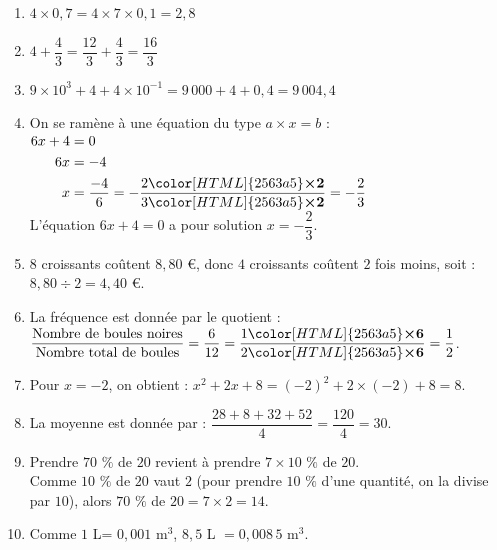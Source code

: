 \documentclass[a4paper,11pt,exos]{nsi} %
\begin{document}
\textcolor{UGLiBlue}{
    \begin{enumerate}[itemsep=1em]
        \item $4 \times 0{,}7=4\times 7\times 0,1=2{,}8$
        \item $4+\dfrac{4}{3}= \dfrac{12}{3}+\dfrac{4}{3}=\dfrac{16}{3}$
        \item $9\times10^3+4+4\times 10^{-1}=9\,000+4+0{,}4=9\,004{,}4$
        \item On se ramène à une équation du type $a\times x=b$ :\\
                  $\begin{aligned}
                  6x+4&=0\\
                 6x&=-4\\
                                      x&=\dfrac{-4}{6}=-\dfrac{2{\color[HTML]{2563a5}\boldsymbol{\times2}} }{3{\color[HTML]{2563a5}\boldsymbol{\times2}}}=-\dfrac{2}{3}
                 \end{aligned}$\\
                  L'équation $6x+4=0$ a pour solution $x=-\dfrac{2}{3}$.
        \item $8$ croissants coûtent  $8{,}80$ €, donc
                               $4$ croissants coûtent $2$ fois moins, soit : \\
                               $8{,}80\div 2=4{,}40$ €.
        \item La fréquence est donnée par le quotient : $\dfrac{\text{Nombre de boules noires}}{\text{Nombre total de boules}}=\dfrac{6}{12}=\dfrac{1{\color[HTML]{2563a5}\boldsymbol{\times6}} }{2{\color[HTML]{2563a5}\boldsymbol{\times6}}}=\dfrac{1}{2}$.
        \item 
                    Pour $x=-2$, on obtient : $x^2+2x+8=(-2)^2+2\times (-2)+8=8$.        
        \item La moyenne est donnée par : $\dfrac{28+8+32+52}{4}=\dfrac{120}{4}=30$.
        \item           Prendre $70$ $\%$  de $20$ revient à prendre $7\times 10$ $\%$  de $20$.\\
                    Comme $10$ $\%$  de $20$ vaut $2$ (pour prendre $10$ $\%$  d'une quantité, on la divise par $10$), alors
                    $70$ $\%$ de $20=7\times 2=14$.
        \item Comme $1$ L= $0,001$ m$^3$, $8{,}5$ L $=0{,}008\,5$  m$^3$.
\end{enumerate}
}
\end{document}

